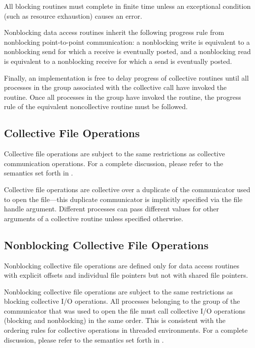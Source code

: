 All blocking routines must complete in finite time
unless an exceptional condition (such as resource exhaustion)
causes an error.

Nonblocking data access routines inherit the following
progress rule from nonblocking point-to-point communication:
a nonblocking write is equivalent to a nonblocking send
for which a receive is eventually posted,
and a nonblocking read is equivalent to a nonblocking receive
for which a send is eventually posted.

Finally,
an implementation is free to delay progress of collective routines
until all processes in the group associated with the collective call
have invoked the routine.
Once all processes in the group have invoked the routine,
the progress rule of the equivalent noncollective routine must be followed.

\subsection{Collective File Operations}
\label{sec:io-semantics-collective}
Collective file operations are subject to the same restrictions
as collective communication operations.
For a complete discussion,
please refer to the semantics set forth in 
.



Collective file operations are collective
over a duplicate of the communicator used to open the file---this
duplicate communicator is implicitly specified via the file handle argument.
Different processes can pass different values for other arguments
of a collective routine unless specified otherwise.

\subsection{Nonblocking Collective File Operations}
Nonblocking collective file operations are defined only for data access
\label{sec:io-semantics-nb-collective}
routines with explicit offsets and individual file pointers but not with
shared file pointers.

Nonblocking collective file operations are subject to the same restrictions as
blocking collective I/O operations. All processes belonging to the group of
the communicator that was used to open the file must call collective I/O
operations (blocking and nonblocking) in the same order. This is consistent
with the ordering rules for collective operations in threaded environments.
For a complete discussion, please refer to the semantics set forth in
.

